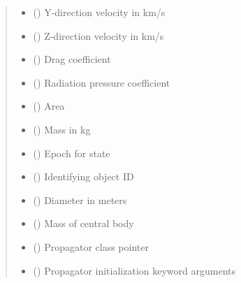 \documentclass[letterpaper,10pt,english]{sphinxmanual}
\begin{document}
\begin{fulllineitems}
\begin{fulllineitems}
\begin{quote}
\begin{description}
\begin{itemize}
\item {} 
 () \textendash{} Y-direction velocity in km/s

\item {} 
 () \textendash{} Z-direction velocity in km/s

\item {} 
 () \textendash{} Drag coefficient

\item {} 
 () \textendash{} Radiation pressure coefficient

\item {} 
 () \textendash{} Area

\item {} 
 () \textendash{} Mass in kg

\item {} 
 () \textendash{} Epoch for state

\item {} 
 () \textendash{} Identifying object ID

\item {} 
 () \textendash{} Diameter in meters

\item {} 
 () \textendash{} Mass of central body

\item {} 
 ({\hyperref[\detokenize{modules/propagator_base:propagator_base.PropagatorBase}]{}}) \textendash{} Propagator class pointer

\item {} 
 () \textendash{} Propagator initialization keyword arguments


\end{itemize}
\end{description}
\end{quote}
\end{fulllineitems}
\end{fulllineitems}
\end{document}
